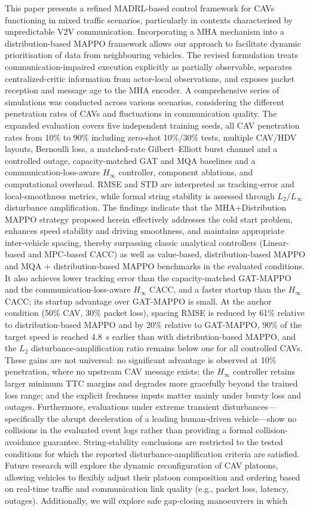 \documentclass{ieeeaccess}
\begin{document}
This paper presents a refined MADRL-based control framework for CAVs functioning in mixed traffic scenarios, particularly in contexts characterised by unpredictable V2V communication. Incorporating a MHA mechanism into a distribution-based MAPPO framework allows our approach to facilitate dynamic prioritisation of data from neighbouring vehicles. The revised formulation treats communication-impaired execution explicitly as partially observable, separates centralized-critic information from actor-local observations, and exposes packet reception and message age to the MHA encoder. A comprehensive series of simulations was conducted across various scenarios, considering the different penetration rates of CAVs and fluctuations in communication quality. The expanded evaluation covers five independent training seeds, all CAV penetration rates from 10\% to 90\% including zero-shot 10\%/30\% tests, multiple CAV/HDV layouts, Bernoulli loss, a matched-rate Gilbert--Elliott burst channel and a controlled outage, capacity-matched GAT and MQA baselines and a communication-loss-aware $H_\infty$ controller, component ablations, and computational overhead. RMSE and STD are interpreted as tracking-error and local-smoothness metrics, while formal string stability is assessed through $L_2/L_\infty$ disturbance amplification. The findings indicate that the MHA+Distribution MAPPO strategy proposed herein effectively addresses the cold start problem, enhances speed stability and driving smoothness, and maintains appropriate inter-vehicle spacing, thereby surpassing classic analytical controllers (Linear-based and MPC-based CACC) as well as value-based, distribution-based MAPPO and MQA + distribution-based MAPPO benchmarks in the evaluated conditions. It also achieves lower tracking error than the capacity-matched GAT-MAPPO and the communication-loss-aware $H_\infty$ CACC, and a faster startup than the $H_\infty$ CACC; its startup advantage over GAT-MAPPO is small. At the anchor condition (50\% CAV, 30\% packet loss), spacing RMSE is reduced by 61\% relative to distribution-based MAPPO and by 20\% relative to GAT-MAPPO, 90\% of the target speed is reached 4.8~s earlier than with distribution-based MAPPO, and the $L_2$ disturbance-amplification ratio remains below one for all controlled CAVs. These gains are not universal: no significant advantage is observed at 10\% penetration, where no upstream CAV message exists; the $H_\infty$ controller retains larger minimum TTC margins and degrades more gracefully beyond the trained loss range; and the explicit freshness inputs matter mainly under bursty loss and outages. Furthermore, evaluations under extreme transient disturbances—specifically the abrupt deceleration of a leading human-driven vehicle—show no collisions in the evaluated event logs rather than providing a formal collision-avoidance guarantee. String-stability conclusions are restricted to the tested conditions for which the reported disturbance-amplification criteria are satisfied. Future research will explore the dynamic reconfiguration of CAV platoons, allowing vehicles to flexibly adjust their platoon composition and ordering based on real-time traffic and communication link quality (e.g., packet loss, latency, outages). Additionally, we will explore safe gap-closing manoeuvrers in which 
\end{document}
